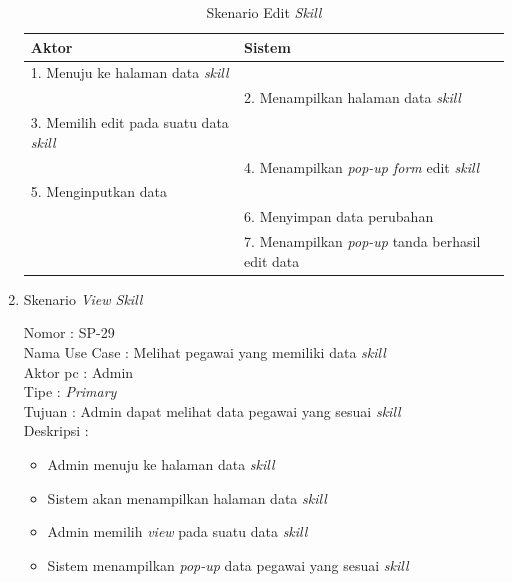 \begin{enumerate}
\begin{itemize}
\end{itemize}

\begin{table}
	\caption{Skenario Edit \textit{Skill}}
	\centering
	\begin{tabular}{ | l | p{66mm} |}
		\hline 
		\textbf{Aktor} & \textbf{Sistem} \\
		\hline
		
		1.	Menuju ke halaman data \textit{skill} &  \\
		
		\hline
		
		&  2.	Menampilkan halaman data \textit{skill} \\
		
		\hline
		
		3. Memilih edit pada suatu data \textit{skill} & \\
		
		\hline
		
		& 4.	Menampilkan \textit{pop-up form} edit \textit{skill} \\
		
		\hline
		
		5.	Menginputkan data  & \\
		\hline
		
		& 6.	Menyimpan data perubahan \\
		\hline
		
		& 7.	Menampilkan \textit{pop-up} tanda berhasil edit data \\
		\hline
		
	\end{tabular}
\end{table}

\item Skenario \textit{View Skill} 

Nomor \kern 3.6pc : SP-29 \\
Nama Use Case : Melihat pegawai yang memiliki data \textit{skill} \\
Aktor  pc : Admin \\
Tipe \kern 4.6pc : \textit{Primary} \\
Tujuan \kern 3.6pc : Admin dapat melihat data pegawai yang sesuai \textit{skill} \\
Deskripsi \kern 2.5pc : 
\\
\begin{itemize}
	\item Admin menuju ke halaman data \textit{skill}
	\item Sistem akan menampilkan halaman data \textit{skill}
	\item Admin memilih \textit{view} pada suatu data \textit{skill}
	\item Sistem menampilkan \textit{pop-up} data pegawai yang sesuai \textit{skill}
	

\end{itemize}
\end{enumerate}
